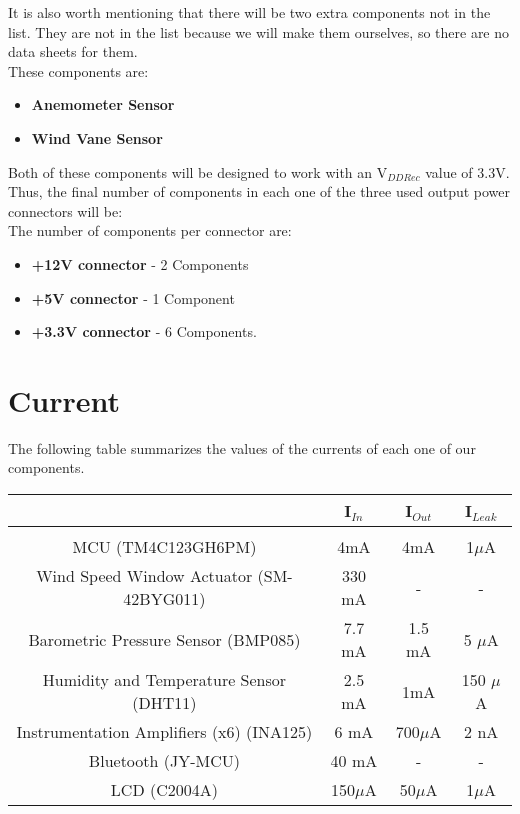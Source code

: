 \documentclass[11pt]{article}
\begin{document}
It is also worth mentioning that there will be two extra components not in the list. They are not in the list because we will make them ourselves, so there are no data sheets for them. \\ 

These components are: 
\begin{itemize}
  \item \textbf{Anemometer Sensor}
  \item \textbf{Wind Vane Sensor}
\end{itemize}  

Both of these components will be designed to work with an V$_{DD Rec}$ value of 3.3V. Thus, the final number of components in each one of the three used output power connectors will be: \\

The number of components per connector are: 
\begin{itemize}
  \item \textbf{+12V connector} - 2 Components
  \item \textbf{+5V connector} - 1 Component
  \item \textbf{+3.3V connector} - 6 Components.
\end{itemize} 

\section{Current}

The following table summarizes the values of the currents of each one of our components. 

\begin{tabular}{|c|c|c|c|}
\hline
 & I$_{In}$ &  I$_{Out}$ & I$_{Leak}$\\
\hline
& & &   \\
MCU (TM4C123GH6PM) & 4mA & 4mA & 1$\mu$A  \\
Wind Speed Window Actuator (SM-42BYG011) & 330 mA & - & -\\
Barometric Pressure Sensor (BMP085) & 7.7 mA  & 1.5 mA & 5 $\mu$A \\
Humidity and Temperature Sensor (DHT11) & 2.5 mA & 1mA & 150 $\mu$A \\
Instrumentation Amplifiers (x6) (INA125) & 6 mA &  700$\mu$A & 2 nA  \\
Bluetooth (JY-MCU) & 40 mA & - & - \\
LCD (C2004A) & 150$\mu$A & 50$\mu$A & 1$\mu$A \\

\hline
\end{tabular} \\ 
\end{document}
